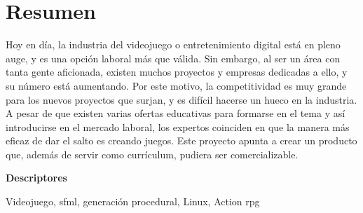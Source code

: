 \chapter*{Resumen}

Hoy en día, la industria del videojuego o entretenimiento digital está en pleno auge, y es una opción laboral más que válida. Sin embargo, al ser un área con tanta gente aficionada, existen muchos proyectos y empresas dedicadas a ello, y su número está aumentando. Por este motivo, la competitividad es muy grande para los nuevos proyectos que surjan, y es difícil hacerse un hueco en la industria. A pesar de que existen varias ofertas educativas para formarse en el tema y así introducirse en el mercado laboral, los expertos coinciden en que la manera más eficaz de dar el salto es creando juegos. Este proyecto apunta a crear un producto que, además de servir como currículum, pudiera ser comercializable.

\vspace{2em}

{\Large\bfseries\sffamily Descriptores}
\vspace{3\medskipamount}

Videojuego, \acrshort{sfml}, generación procedural, Linux, Action \acrshort{rpg}